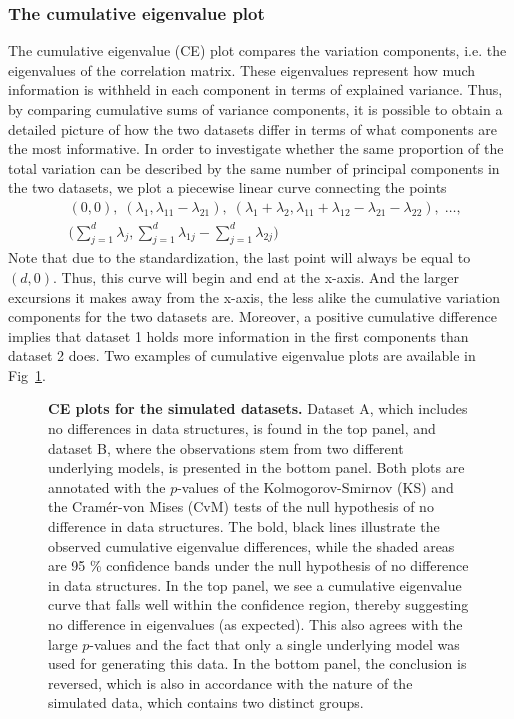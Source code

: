 \documentclass[a4paper,14pt]{article}
\begin{document}
\subsubsection*{The cumulative eigenvalue plot}
The cumulative eigenvalue (CE) plot compares the variation components, i.e. the eigenvalues of the correlation matrix. These eigenvalues represent how much information is withheld in each component in terms of explained variance. Thus, by comparing cumulative sums of variance components, it is possible to obtain a detailed picture of how the two datasets differ in terms of what components are the most informative. In order to investigate whether the same proportion of the total variation can be described by the same number of principal components in the two datasets, we plot a piecewise linear curve connecting the points
\begin{align*}
&(0,0), \;
(\lambda_1,\lambda_{11}-\lambda_{21}), \;
(\lambda_1 + \lambda_2,\lambda_{11}+\lambda_{12}-\lambda_{21}-\lambda_{22}), \;
\ldots, \\
&\bigg( \sum_{j=1}^d \lambda_j, \sum_{j=1}^d \lambda_{1j} - \sum_{j=1}^d \lambda_{2j} \bigg)
\end{align*}
Note that due to the standardization, the last point will always be equal to $(d,0)$. Thus, this curve will begin and end at the x-axis. And the larger excursions it makes away from the x-axis, the less alike the cumulative variation components for the two datasets are. Moreover, a positive cumulative difference implies that dataset 1 holds more information in the first components than dataset 2 does. Two examples of cumulative eigenvalue plots are available in Fig~\ref{plot.simCE}.

\begin{figure}[!h]
\caption{{\bf CE plots for the simulated datasets.} Dataset A, which includes no differences in data structures, is found in the top panel, and dataset B, where the observations stem from two different underlying models, is presented in the bottom panel. Both plots are annotated with the $p$-values of the Kolmogorov-Smirnov (KS) and the Cram\'er-von Mises (CvM) tests of the null hypothesis of no difference in data structures. The bold, black lines illustrate the observed cumulative eigenvalue differences, while the shaded areas are 95 \% confidence bands under the null hypothesis of no difference in data structures. In the top panel, we see a cumulative eigenvalue curve that falls well within the confidence region, thereby suggesting no difference in eigenvalues (as expected). This also agrees with the large $p$-values and the fact that only a single underlying model was used for generating this data. In the bottom panel, the conclusion is reversed, which is also in accordance with the nature of the simulated data, which contains two distinct groups.}
\label{plot.simCE}
\end{figure}
\end{document}

